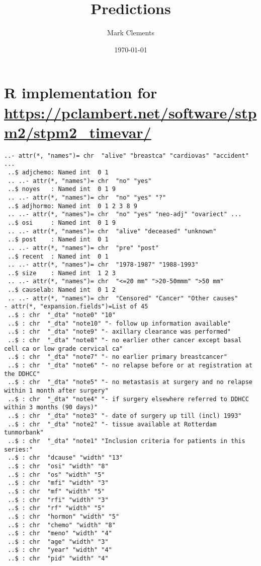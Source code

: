 \documentclass[11pt]{article}
\author{Mark Clements}
\date{\today}
\title{Predictions}
\begin{document}
\maketitle
\tableofcontents


\section{R implementation for \url{https://pclambert.net/software/stpm2/stpm2_timevar/}}
\label{sec:orgheadline1}

\begin{verbatim}
..- attr(*, "names")= chr  "alive" "breastca" "cardiovas" "accident" ...
 ..$ adjchemo: Named int  0 1
 .. ..- attr(*, "names")= chr  "no" "yes"
 ..$ noyes   : Named int  0 1 9
 .. ..- attr(*, "names")= chr  "no" "yes" "?"
 ..$ adjhormo: Named int  0 1 2 3 8 9
 .. ..- attr(*, "names")= chr  "no" "yes" "neo-adj" "ovariect" ...
 ..$ osi     : Named int  0 1 9
 .. ..- attr(*, "names")= chr  "alive" "deceased" "unknown"
 ..$ post    : Named int  0 1
 .. ..- attr(*, "names")= chr  "pre" "post"
 ..$ recent  : Named int  0 1
 .. ..- attr(*, "names")= chr  "1978-1987" "1988-1993"
 ..$ size    : Named int  1 2 3
 .. ..- attr(*, "names")= chr  "<=20 mm" ">20-50mmm" ">50 mm"
 ..$ causelab: Named int  0 1 2
 .. ..- attr(*, "names")= chr  "Censored" "Cancer" "Other causes"
- attr(*, "expansion.fields")=List of 45
 ..$ : chr  "_dta" "note0" "10"
 ..$ : chr  "_dta" "note10" "- follow up information available"
 ..$ : chr  "_dta" "note9" "- axillary clearance was performed"
 ..$ : chr  "_dta" "note8" "- no earlier other cancer except basal cell ca or low grade cervical ca"
 ..$ : chr  "_dta" "note7" "- no earlier primary breastcancer"
 ..$ : chr  "_dta" "note6" "- no relapse before or at registration at the DDHCC"
 ..$ : chr  "_dta" "note5" "- no metastasis at surgery and no relapse within 1 month after surgery"
 ..$ : chr  "_dta" "note4" "- if surgery elsewhere referred to DDHCC within 3 months (90 days)"
 ..$ : chr  "_dta" "note3" "- date of surgery up till (incl) 1993"
 ..$ : chr  "_dta" "note2" "- tissue available at Rotterdam tunmorbank"
 ..$ : chr  "_dta" "note1" "Inclusion criteria for patients in this series:"
 ..$ : chr  "dcause" "width" "13"
 ..$ : chr  "osi" "width" "8"
 ..$ : chr  "os" "width" "5"
 ..$ : chr  "mfi" "width" "3"
 ..$ : chr  "mf" "width" "5"
 ..$ : chr  "rfi" "width" "3"
 ..$ : chr  "rf" "width" "5"
 ..$ : chr  "hormon" "width" "5"
 ..$ : chr  "chemo" "width" "8"
 ..$ : chr  "meno" "width" "4"
 ..$ : chr  "age" "width" "3"
 ..$ : chr  "year" "width" "4"
 ..$ : chr  "pid" "width" "4"

\end{verbatim}
\end{document}
